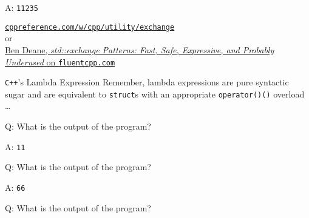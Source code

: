 \addtocounter{framenumber}{-1}
\begin{frame}[fragile]{A: \texttt{11235}}

    \footnotesize
    \begin{center}
    \href{https://en.cppreference.com/w/cpp/utility/exchange}{\texttt{cppreference.com/w/cpp/utility/exchange}} \\
    or \\
    \href{https://www.fluentcpp.com/2020/09/25/stdexchange-patterns-fast-safe-expressive-and-probably-underused/}{Ben Deane, \textit{std::exchange Patterns: Fast, Safe, Expressive, and Probably Underused} on \texttt{fluentcpp.com}}
    \end{center}
\end{frame}

\begin{frame}{\texttt{C++}'s Lambda Expression}
    Remember, lambda expressions are pure syntactic sugar and are equivalent to \texttt{struct}s with an appropriate \texttt{operator()()} overload \ldots
\end{frame}

\begin{frame}[fragile]{Q: What is the output of the program?}
\end{frame}

\addtocounter{framenumber}{-1}
\begin{frame}[fragile]{A: \texttt{11}}
\end{frame}

\begin{frame}[fragile]{Q: What is the output of the program?}
\end{frame}

\addtocounter{framenumber}{-1}
\begin{frame}[fragile]{A: \texttt{66}}
\end{frame}

\begin{frame}[fragile]{Q: What is the output of the program?}

\end{frame}

